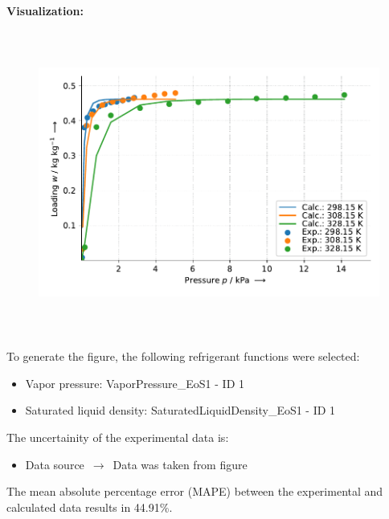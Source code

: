 \textbf{Visualization:}
%
\begin{figure}[!htp]
{\noindent\includegraphics[height=10cm, keepaspectratio]{figs/ads/ads_Water_mof_powder_CPO-27(Ni)_DubininAstakhov_1.pdf}}
\end{figure}
%

To generate the figure, the following refrigerant functions were selected:
\begin{itemize}
\item Vapor pressure: VaporPressure\_EoS1 - ID 1
\item Saturated liquid density: SaturatedLiquidDensity\_EoS1 - ID 1
\end{itemize}

The uncertainity of the experimental data is:
\begin{itemize}
\item Data source $\,\to\,$ Data was taken from figure
\end{itemize}

The mean absolute percentage error (MAPE) between the experimental and calculated data results in 44.91\%.
\FloatBarrier
\newpage
